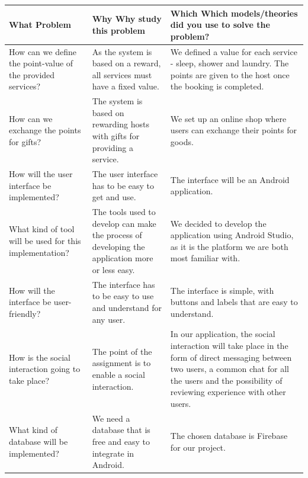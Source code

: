 \documentclass[paper=a4, fontsize=12pt,DIV=14]{scrartcl}    %
\begin{document}
            \begin{tabular}{|p{5cm}|p{5cm}|p{5cm}|}
	            \hline
                \textbf{What} \newline Problem & \textbf{Why} \newline Why study this problem & \textbf{Which} \newline Which models/theories did you use to solve the problem?\\
                \hline
                \hline
                How can we define the point-value of the provided services?
                & As the system is based on a reward, all services must have a fixed value.
                & We defined a value for each service - sleep, shower and laundry. The points are given to the host once the booking is completed.\\
                \hline
                How can we exchange the points for gifts?
                & The system is based on rewarding hosts with gifts for providing a service.
                & We set up an online shop where users can exchange their points for goods.\\
                \hline
                How will the user interface be implemented?
                & The user interface has to be easy to get and use.
                & The interface will be an Android application.\\
                \hline
                What kind of tool will be used for this implementation?
                & The tools used to develop can make the process of developing the application more or less easy.
                & We decided to develop the application using Android Studio, as it is the platform we are both most familiar with.\\
                \hline
                How will the interface be user-friendly?
                & The interface has to be easy to use and understand for any user.
                & The interface is simple, with buttons and labels that are easy to understand. \\
                \hline
                How is the social interaction going to take place?
                &The point of the assignment is to enable a social interaction.
                & In our application, the social interaction will take place in the form of direct messaging between two users, a common chat for all the users and the possibility of reviewing experience with other users.\\
                \hline
                What kind of database will be implemented?
                & We need a database that is free and easy to integrate in Android.
                & The chosen database is Firebase for our project.\\
                \hline
            \end{tabular}
\end{document}
